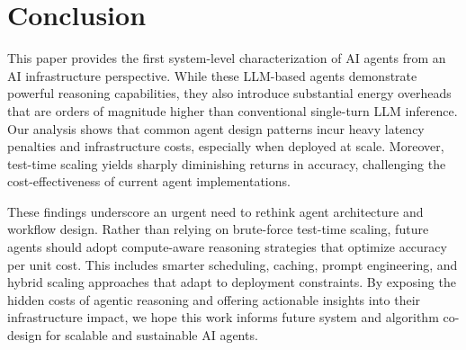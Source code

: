 \section{Conclusion}
\label{sect:conclusion}

This paper provides the first system-level characterization of AI agents from an AI infrastructure perspective. While these LLM-based agents demonstrate powerful reasoning capabilities, they also introduce substantial energy overheads that are orders of magnitude higher than conventional single-turn LLM inference. Our analysis shows that common agent design patterns
incur heavy latency penalties and infrastructure costs, especially when deployed at scale. Moreover, test-time scaling yields sharply diminishing returns in accuracy, challenging the cost-effectiveness of current agent implementations.

These findings underscore an urgent need to rethink agent architecture and workflow design. Rather than relying on brute-force test-time scaling, future agents should adopt compute-aware reasoning strategies that optimize accuracy per unit cost. This includes smarter scheduling, caching, prompt engineering, and hybrid scaling approaches that adapt to deployment constraints. By exposing the hidden costs of agentic reasoning and offering actionable insights into their infrastructure impact, we hope this work informs future system and algorithm co-design for scalable and sustainable AI agents.

